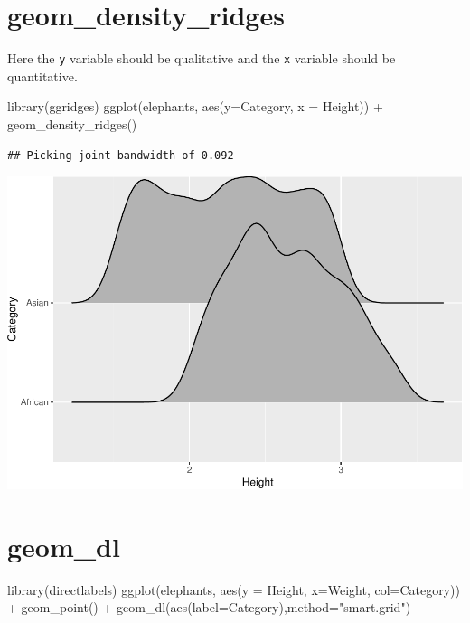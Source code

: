 \documentclass[
]{book}
\newenvironment{Shaded}{\begin{snugshade}}{\end{snugshade}}
\newcommand{\AttributeTok}[1]{\textcolor[rgb]{0.77,0.63,0.00}{#1}}
\newcommand{\FunctionTok}[1]{\textcolor[rgb]{0.00,0.00,0.00}{#1}}
\newcommand{\NormalTok}[1]{#1}
\newcommand{\SpecialCharTok}[1]{\textcolor[rgb]{0.00,0.00,0.00}{#1}}
\newcommand{\StringTok}[1]{\textcolor[rgb]{0.31,0.60,0.02}{#1}}
\begin{document}
\hypertarget{geom_density_ridges}{%
\section{geom\_density\_ridges}\label{geom_density_ridges}}

Here the \texttt{y} variable should be qualitative and the \texttt{x} variable should be quantitative.

\begin{Shaded}
\begin{Highlighting}[]
\FunctionTok{library}\NormalTok{(ggridges)}
\FunctionTok{ggplot}\NormalTok{(elephants, }\FunctionTok{aes}\NormalTok{(}\AttributeTok{y=}\NormalTok{Category, }\AttributeTok{x =}\NormalTok{ Height)) }\SpecialCharTok{+} 
    \FunctionTok{geom\_density\_ridges}\NormalTok{()}
\end{Highlighting}
\end{Shaded}

\begin{verbatim}
## Picking joint bandwidth of 0.092
\end{verbatim}

\includegraphics{Data-Visualisation-geom-Encyclopedia_files/figure-latex/unnamed-chunk-34-1.pdf}

\hypertarget{geom_dl}{%
\section{geom\_dl}\label{geom_dl}}

\begin{Shaded}
\begin{Highlighting}[]
\FunctionTok{library}\NormalTok{(directlabels)}
\FunctionTok{ggplot}\NormalTok{(elephants, }\FunctionTok{aes}\NormalTok{(}\AttributeTok{y =}\NormalTok{ Height, }\AttributeTok{x=}\NormalTok{Weight, }\AttributeTok{col=}\NormalTok{Category)) }\SpecialCharTok{+} 
  \FunctionTok{geom\_point}\NormalTok{() }\SpecialCharTok{+}
  \FunctionTok{geom\_dl}\NormalTok{(}\FunctionTok{aes}\NormalTok{(}\AttributeTok{label=}\NormalTok{Category),}\AttributeTok{method=}\StringTok{"smart.grid"}\NormalTok{)}
\end{Highlighting}
\end{Shaded}
\end{document}
